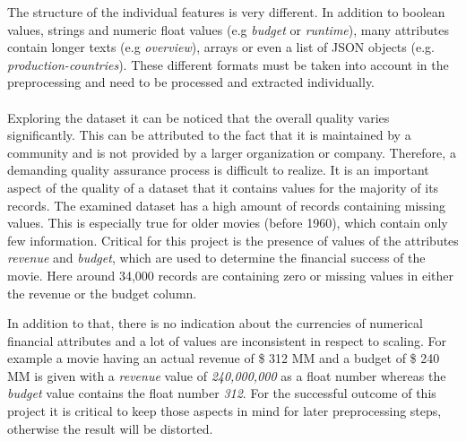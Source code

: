 The structure of the individual features is very different. In addition to boolean values, strings and numeric float values (e.g \textit{budget} or \textit{runtime}), many attributes contain longer texts (e.g \textit{overview}), arrays or even a list of JSON objects (e.g. \textit{production-countries}). These different formats must be taken into account in the preprocessing and need to be processed and extracted individually.
\\\\
Exploring the dataset it can be noticed that the overall quality varies significantly. This can be attributed to the fact that it is maintained by a community and is not provided by a larger organization or company. Therefore, a demanding quality assurance process is difficult to realize. It is an important aspect of the quality of a dataset that it contains values for the majority of its records. The examined dataset has a high amount of records containing missing values. This is especially true for older movies (before 1960), which contain only few information. Critical for this project is the presence of values of the attributes \textit{revenue} and \textit{budget}, which are used to determine the financial success of the movie. Here around 34,000 records are containing zero or missing values in either the revenue or the budget column.

In addition to that, there is no indication about the currencies of numerical financial attributes and a lot of values are inconsistent in respect to scaling. For example a movie having an actual revenue of \$ 312 MM and a budget of \$ 240 MM is given with a \textit{revenue} value of \textit{240,000,000} as a float number whereas the \textit{budget} value contains the float number \textit{312}. For the successful outcome of this project it is critical to keep those aspects in mind for later preprocessing steps, otherwise the result will be distorted.


